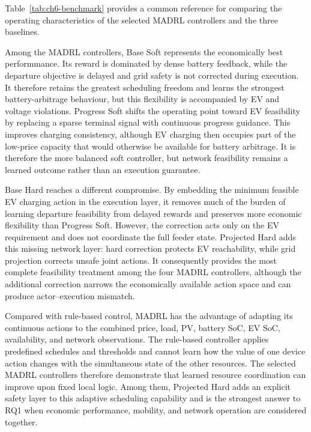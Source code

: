 Table~\ref{tab:ch6-benchmark} provides a common reference for comparing the operating characteristics of the selected MADRL controllers and the three baselines.

Among the MADRL controllers, Base Soft represents the economically best performmance. Its reward is dominated by dense battery feedback, while the departure objective is delayed and grid safety is not corrected during execution. It therefore retains the greatest scheduling freedom and learns the strongest battery-arbitrage behaviour, but this flexibility is accompanied by EV and voltage violations. Progress Soft shifts the operating point toward EV feasibility by replacing a sparse terminal signal with continuous progress guidance. This improves charging consistency, although EV charging then occupies part of the low-price capacity that would otherwise be available for battery arbitrage. It is therefore the more balanced soft controller, but network feasibility remains a learned outcome rather than an execution guarantee.

Base Hard reaches a different compromise. By embedding the minimum feasible EV charging action in the execution layer, it removes much of the burden of learning departure feasibility from delayed rewards and preserves more economic flexibility than Progress Soft. However, the correction acts only on the EV requirement and does not coordinate the full feeder state. Projected Hard adds this missing network layer: hard correction protects EV reachability, while grid projection corrects unsafe joint actions. It consequently provides the most complete feasibility treatment among the four MADRL controllers, although the additional correction narrows the economically available action space and can produce actor--execution mismatch.

Compared with rule-based control, MADRL has the advantage of adapting its continuous actions to the combined price, load, PV, battery SoC, EV SoC, availability, and network observations. The rule-based controller applies predefined schedules and thresholds and cannot learn how the value of one device action changes with the simultaneous state of the other resources. The selected MADRL controllers therefore demonstrate that learned resource coordination can improve upon fixed local logic. Among them, Projected Hard adds an explicit safety layer to this adaptive scheduling capability and is the strongest answer to RQ1 when economic performance, mobility, and network operation are considered together.

